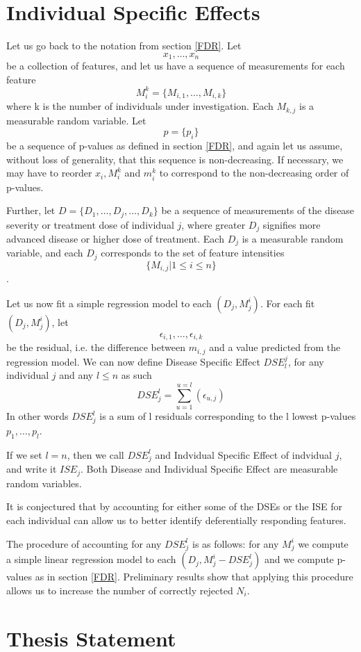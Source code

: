 \section{Individual Specific Effects} \label{ISE}

Let us go back to the notation from section \ref{FDR}. Let $$x_{1}, \ldots, x_{n}$$ be a collection of features, and let us have a sequence of measurements for each feature
$$M^{k}_{i}=\{M_{i,1}, \ldots, M_{i,k}\}$$
where k is the number of individuals under investigation. Each $M_{k, j}$ is a measurable random variable. Let $$p=\{p_{i}\}$$ be a sequence of p-values as defined in section \ref{FDR}, and again let us assume, without loss of generality, that this sequence is non-decreasing. If necessary, we may have to reorder $x_{i}, M_{i}^{k}$ and $m_{i}^{k}$ to correspond to the non-decreasing order of p-values.

Further, let $D=\{D_{1}, \ldots, D_{j}, \ldots, D_{k}\}$ be a sequence of measurements of the disease severity or treatment dose of individual $j$, where greater $D_{j}$ signifies more advanced disease or higher dose of treatment. Each $D_{j}$ is a measurable random variable, and each $D_{j}$ corresponds to the set of feature intensities $$\{M_{i,j} | 1 \leq i \leq n \}$$.

Let us now fit a simple regression model to each $(D_{j}, M^{i}_{j})$. For each fit $(D_{j}, M^{i}_{j})$, let $$\epsilon_{i, 1}, \ldots, \epsilon_{i, k}$$ be the residual, i.e. the difference between $m_{i, j}$ and a value predicted from the regression model. We can now define Disease Specific Effect $DSE^{j}_{l}$, for any individual $j$ and any $l \leq n$ as such
$$DSE^{l}_{j}=\sum^{u=l}_{u=1}(\epsilon_{u,j})$$
In other words $DSE^{l}_{j}$ is a sum of l residuals corresponding to the l lowest p-values $p_{1}, \ldots, p_{l}$.

If we set $l = n$, then we call $DSE^{l}_{j}$ and Indvidual Specific Effect of indvidual $j$, and write it $ISE_{j}$. Both Disease and Individual Specific Effect are measurable random variables.

It is conjectured that by accounting for either some of the DSEs or the ISE for each individual can allow us to better identify deferentially responding features.

The procedure of accounting for any $DSE^{l}_{j}$ is as follows: for any $M^{i}_{j}$ we compute a simple linear regression model to each $(D_{j}, M^{i}_{j} - DSE^{l}_{j})$ and we compute p-values as in section \ref{FDR}. Preliminary results show that applying this procedure allows us to increase the number of correctly rejected $N_{i}$.
%
\section{Thesis Statement}
\label{c:intro:thesisstatement}


